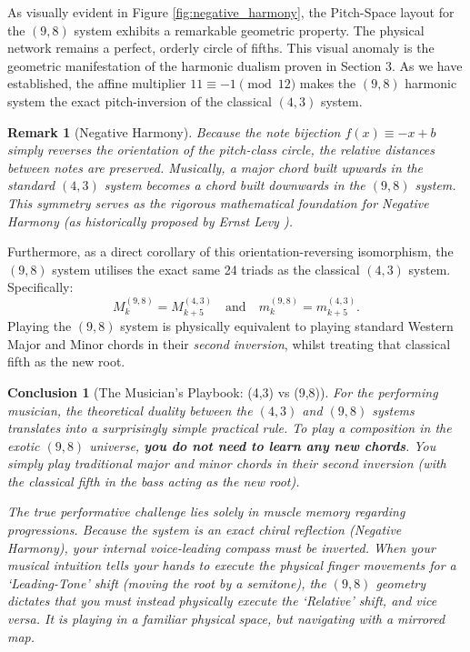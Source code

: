 \documentclass[11pt,letterpaper]{amsart}
\newtheorem{conclusion}{Conclusion}
\newtheorem{remark}{Remark}
\begin{document}
As visually evident in Figure \ref{fig:negative_harmony}, the Pitch-Space layout for the $(9,8)$ system exhibits a remarkable geometric property. The physical network remains a perfect, orderly circle of fifths. This visual anomaly is the geometric manifestation of the harmonic dualism proven in Section 3. As we have established, the affine multiplier $11 \equiv -1 \pmod{12}$ makes the $(9,8)$ harmonic system the exact pitch-inversion of the classical $(4,3)$ system. 

\begin{remark}[Negative Harmony]
  Because the note bijection $f(x) \equiv -x + b$ simply reverses the orientation of the pitch-class circle, the relative distances between notes are preserved. Musically, a major chord built upwards in the standard $(4,3)$ system becomes a chord built downwards in the $(9,8)$ system. This symmetry serves as the rigorous mathematical foundation for \textit{Negative Harmony} (as historically proposed by Ernst Levy \cite{levy_harmony}).
\end{remark}

Furthermore, as a direct corollary of this orientation-reversing isomorphism, the $(9,8)$ system utilises the exact same 24 triads as the classical $(4,3)$ system. Specifically:
\begin{equation}
    M^{(9,8)}_k = M^{(4,3)}_{k+5} \quad \text{and} \quad m^{(9,8)}_k = m^{(4,3)}_{k+5}.
\end{equation}
Playing the $(9,8)$ system is physically equivalent to playing standard Western Major and Minor chords in their \textit{second inversion}, whilst treating that classical fifth as the new root.




\begin{conclusion}[The Musician's Playbook: (4,3) vs (9,8)]
For the performing musician, the theoretical duality between the $(4,3)$ and $(9,8)$ systems translates into a surprisingly simple practical rule. To play a composition in the exotic $(9,8)$ universe, \textbf{you do not need to learn any new chords}. You simply play traditional major and minor chords in their second inversion (with the classical fifth in the bass acting as the new root). 

The true performative challenge lies solely in muscle memory regarding progressions. Because the system is an exact chiral reflection (Negative Harmony), your internal voice-leading compass must be inverted. When your musical intuition tells your hands to execute the physical finger movements for a `Leading-Tone' shift (moving the root by a semitone), the $(9,8)$ geometry dictates that you must instead physically execute the `Relative' shift, and vice versa. It is playing in a familiar physical space, but navigating with a mirrored map.
\end{conclusion}
\end{document}
